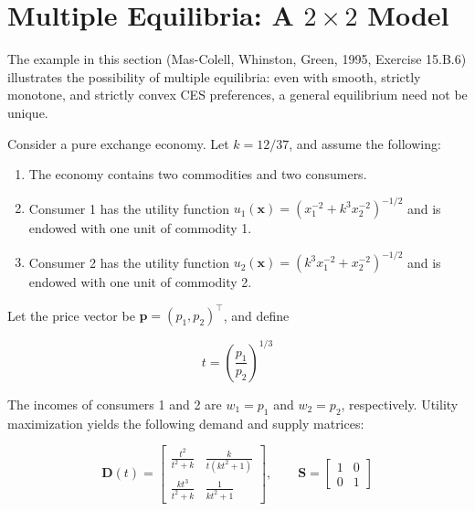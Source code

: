\documentclass[
  letterpaper,
  DIV=11,
  numbers=noendperiod]{scrreprt}
\newenvironment{Shaded}{\begin{snugshade}}{\end{snugshade}}
\newcommand{\ConstantTok}[1]{\textcolor[rgb]{0.56,0.35,0.01}{#1}}
\newcommand{\FloatTok}[1]{\textcolor[rgb]{0.68,0.00,0.00}{#1}}
\newcommand{\FunctionTok}[1]{\textcolor[rgb]{0.28,0.35,0.67}{#1}}
\newcommand{\NormalTok}[1]{\textcolor[rgb]{0.00,0.23,0.31}{#1}}
\newcommand{\OperatorTok}[1]{\textcolor[rgb]{0.37,0.37,0.37}{#1}}
\begin{document}
%

\section{\texorpdfstring{Multiple Equilibria: A \(2\times2\)
Model}{Multiple Equilibria: A 2\textbackslash times2 Model}}\label{multiple-equilibria-a-2times2-model}

The example in this section (Mas-Colell, Whinston, Green, 1995, Exercise
15.B.6) illustrates the possibility of multiple equilibria: even with
smooth, strictly monotone, and strictly convex CES preferences, a
general equilibrium need not be unique.

Consider a pure exchange economy. Let \(k=12/37\), and assume the
following:

\begin{enumerate}
\def\labelenumi{\arabic{enumi}.}
\item
  The economy contains two commodities and two consumers.
\item
  Consumer 1 has the utility function
  \(u_1(\mathbf x)=(x_1^{-2}+k^3x_2^{-2})^{-1/2}\) and is endowed with
  one unit of commodity 1.
\item
  Consumer 2 has the utility function
  \(u_2(\mathbf x)=(k^3x_1^{-2}+x_2^{-2})^{-1/2}\) and is endowed with
  one unit of commodity 2.
\end{enumerate}

Let the price vector be \(\mathbf p=(p_1,p_2)^\top\), and define

\[
t=\left(\frac{p_1}{p_2}\right)^{1/3}
\]

The incomes of consumers 1 and 2 are \(w_1=p_1\) and \(w_2=p_2\),
respectively. Utility maximization yields the following demand and
supply matrices:

\[
\mathbf D(t)=
\begin{bmatrix}
\frac{t^2}{t^2+k} & \frac{k}{t(kt^2+1)}\\
\frac{kt^3}{t^2+k} & \frac{1}{kt^2+1}
\end{bmatrix},
\qquad
\mathbf S=
\begin{bmatrix}
1&0\\
0&1
\end{bmatrix}
\]
\end{document}
